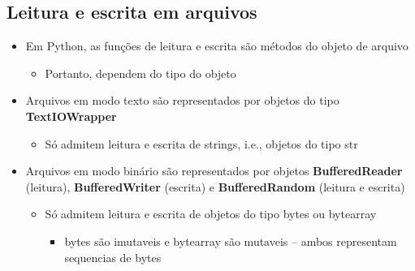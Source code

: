 \documentclass[12pt]{article}
\begin{document}
        \subsection{Leitura e escrita em arquivos}
        \begin{itemize}
            \item Em Python, as funções de leitura e escrita são métodos do 
            objeto de arquivo
            \begin{itemize}
                \item Portanto, dependem do tipo do objeto
            \end{itemize}
            \item Arquivos em modo texto são representados por objetos do tipo 
            \textbf{TextIOWrapper}
            \begin{itemize}
                \item Só admitem leitura e escrita de strings, i.e., objetos 
                do tipo str
            \end{itemize}
            \item Arquivos em modo binário são representados por objetos 
            \textbf{BufferedReader} (leitura), \textbf{BufferedWriter} (escrita) 
            e \textbf{BufferedRandom} (leitura e escrita)
            \begin{itemize}
                \item Só admitem leitura e escrita de objetos do tipo bytes ou 
                bytearray
                \begin{itemize}
                    \item bytes são imutaveis e bytearray são mutaveis -- ambos 
                    representam sequencias de bytes
                \end{itemize}
            \end{itemize} 
        \end{itemize}
\end{document}
